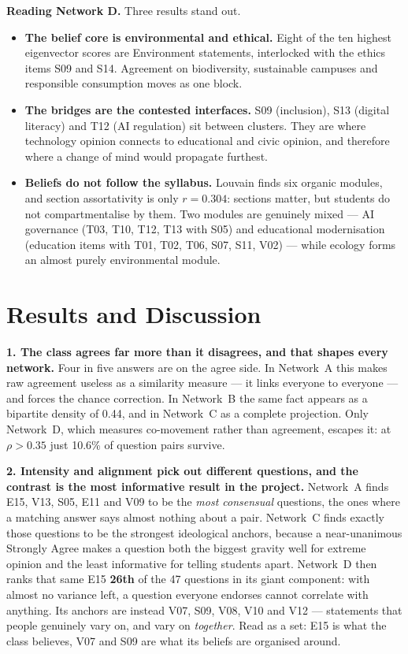 \documentclass[11pt, a4paper]{article}
\begin{document}
\textbf{Reading Network D.} Three results stand out.

\begin{itemize}[nosep]
  \item \textbf{The belief core is environmental and ethical.} Eight of the ten highest eigenvector scores are
  Environment statements, interlocked with the ethics items S09 and S14. Agreement on biodiversity, sustainable
  campuses and responsible consumption moves as one block.
  \item \textbf{The bridges are the contested interfaces.} S09 (inclusion), S13 (digital literacy) and T12 (AI
  regulation) sit between clusters. They are where technology opinion connects to educational and civic
  opinion, and therefore where a change of mind would propagate furthest.
  \item \textbf{Beliefs do not follow the syllabus.} Louvain finds six organic modules, and section
  assortativity is only $r = 0.304$: sections matter, but students do not compartmentalise by them. Two modules
  are genuinely mixed --- AI governance (T03, T10, T12, T13 with S05) and educational modernisation (education
  items with T01, T02, T06, S07, S11, V02) --- while ecology forms an almost purely environmental module.
\end{itemize}

\section{Results and Discussion}

\textbf{1. The class agrees far more than it disagrees, and that shapes every network.} Four in five answers are
on the agree side. In Network~A this makes raw agreement useless as a similarity measure --- it links everyone
to everyone --- and forces the chance correction. In Network~B the same fact appears as a bipartite density of
0.44, and in Network~C as a complete projection. Only Network~D, which measures co-movement rather than
agreement, escapes it: at $\rho > 0.35$ just 10.6\% of question pairs survive.

\textbf{2. Intensity and alignment pick out different questions, and the contrast is the most informative
result in the project.} Network~A finds E15, V13, S05, E11 and V09 to be the \emph{most consensual} questions,
the ones where a matching answer says almost nothing about a pair. Network~C finds exactly those questions to be
the strongest ideological anchors, because a near-unanimous Strongly Agree makes a question both the biggest
gravity well for extreme opinion and the least informative for telling students apart. Network~D then ranks that same E15 \textbf{26th} of the 47 questions in its
giant component: with almost no variance left, a question everyone endorses cannot correlate with anything. Its anchors are instead V07, S09, V08, V10 and V12 --- statements that people genuinely vary on, and
vary on \emph{together}. Read as a set: E15 is what the class believes, V07 and S09 are what its beliefs are
organised around.
\end{document}
